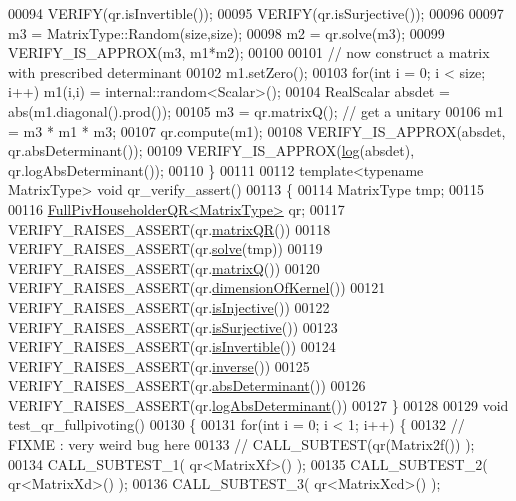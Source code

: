 \begin{DoxyCode}
00094   VERIFY(qr.isInvertible());
00095   VERIFY(qr.isSurjective());
00096 
00097   m3 = MatrixType::Random(size,size);
00098   m2 = qr.solve(m3);
00099   VERIFY\_IS\_APPROX(m3, m1*m2);
00100 
00101   \textcolor{comment}{// now construct a matrix with prescribed determinant}
00102   m1.setZero();
00103   \textcolor{keywordflow}{for}(\textcolor{keywordtype}{int} i = 0; i < size; i++) m1(i,i) = internal::random<Scalar>();
00104   RealScalar absdet = abs(m1.diagonal().prod());
00105   m3 = qr.matrixQ(); \textcolor{comment}{// get a unitary}
00106   m1 = m3 * m1 * m3;
00107   qr.compute(m1);
00108   VERIFY\_IS\_APPROX(absdet, qr.absDeterminant());
00109   VERIFY\_IS\_APPROX(\hyperlink{structlog}{log}(absdet), qr.logAbsDeterminant());
00110 \}
00111 
00112 \textcolor{keyword}{template}<\textcolor{keyword}{typename} MatrixType> \textcolor{keywordtype}{void} qr\_verify\_assert()
00113 \{
00114   MatrixType tmp;
00115 
00116   \hyperlink{group___q_r___module}{FullPivHouseholderQR<MatrixType>} qr;
00117   VERIFY\_RAISES\_ASSERT(qr.\hyperlink{group___q_r___module_a9c16411e5d8f1fc634a5797018d5aa3e}{matrixQR}())
00118   VERIFY\_RAISES\_ASSERT(qr.\hyperlink{group___q_r___module_a6f1b0a116c78e642e3d2a100a29d1a4a}{solve}(tmp))
00119   VERIFY\_RAISES\_ASSERT(qr.\hyperlink{group___q_r___module_ad26dd2d3c002939771d2375e4e051c28}{matrixQ}())
00120   VERIFY\_RAISES\_ASSERT(qr.\hyperlink{group___q_r___module_a3b5fe5edc66acc01c45b16e728470aa0}{dimensionOfKernel}())
00121   VERIFY\_RAISES\_ASSERT(qr.\hyperlink{group___q_r___module_a6776788011026b0f63192485a59deaed}{isInjective}())
00122   VERIFY\_RAISES\_ASSERT(qr.\hyperlink{group___q_r___module_aa3593db4708ce9079b0bdf219b99f57e}{isSurjective}())
00123   VERIFY\_RAISES\_ASSERT(qr.\hyperlink{group___q_r___module_aeb1d779ec22ec68a5a28d4235db02ec1}{isInvertible}())
00124   VERIFY\_RAISES\_ASSERT(qr.\hyperlink{group___q_r___module_a352ce66397af06da214ddde343cec6f5}{inverse}())
00125   VERIFY\_RAISES\_ASSERT(qr.\hyperlink{group___q_r___module_a1029e1ccc70bb8669043c5775e7f3b75}{absDeterminant}())
00126   VERIFY\_RAISES\_ASSERT(qr.\hyperlink{group___q_r___module_aafde38918912c9b562f44b0fc3b22589}{logAbsDeterminant}())
00127 \}
00128 
00129 \textcolor{keywordtype}{void} test\_qr\_fullpivoting()
00130 \{
00131  \textcolor{keywordflow}{for}(\textcolor{keywordtype}{int} i = 0; i < 1; i++) \{
00132     \textcolor{comment}{// FIXME : very weird bug here}
00133 \textcolor{comment}{//     CALL\_SUBTEST(qr(Matrix2f()) );}
00134     CALL\_SUBTEST\_1( qr<MatrixXf>() );
00135     CALL\_SUBTEST\_2( qr<MatrixXd>() );
00136     CALL\_SUBTEST\_3( qr<MatrixXcd>() );

\end{DoxyCode}
